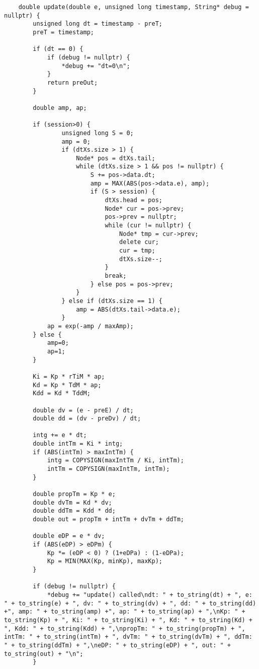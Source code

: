 \documentclass[a4paper,12pt]{article}
\begin{document}
\begin{lstlising}[language=C++]
\begin{lstlisting}
    double update(double e, unsigned long timestamp, String* debug = nullptr) {
        unsigned long dt = timestamp - preT;
        preT = timestamp;

        if (dt == 0) {
            if (debug != nullptr) {
                *debug += "dt=0\n";
            }
            return preOut;
        }

        double amp, ap;

        if (session>0) {
                unsigned long S = 0;
                amp = 0;
                if (dtXs.size > 1) {
                    Node* pos = dtXs.tail;
                    while (dtXs.size > 1 && pos != nullptr) {
                        S += pos->data.dt;
                        amp = MAX(ABS(pos->data.e), amp);
                        if (S > session) {
                            dtXs.head = pos;
                            Node* cur = pos->prev;
                            pos->prev = nullptr;
                            while (cur != nullptr) {
                                Node* tmp = cur->prev;
                                delete cur;
                                cur = tmp;
                                dtXs.size--;
                            }
                            break;
                        } else pos = pos->prev;
                    }
                } else if (dtXs.size == 1) {
                    amp = ABS(dtXs.tail->data.e);
                }        
            ap = exp(-amp / maxAmp);
        } else {
            amp=0;
            ap=1;
        }

        Ki = Kp * rTiM * ap;
        Kd = Kp * TdM * ap;
        Kdd = Kd * TddM;

        double dv = (e - preE) / dt;
        double dd = (dv - preDv) / dt;

        intg += e * dt;
        double intTm = Ki * intg;
        if (ABS(intTm) > maxIntTm) {
            intg = COPYSIGN(maxIntTm / Ki, intTm);
            intTm = COPYSIGN(maxIntTm, intTm);
        }

        double propTm = Kp * e;
        double dvTm = Kd * dv;
        double ddTm = Kdd * dd;
        double out = propTm + intTm + dvTm + ddTm;

        double eDP = e * dv;
        if (ABS(eDP) > eDPm) {
            Kp *= (eDP < 0) ? (1+eDPa) : (1-eDPa);
            Kp = MIN(MAX(Kp, minKp), maxKp);
        }

        if (debug != nullptr) {
            *debug += "update() called\ndt: " + to_string(dt) + ", e: " + to_string(e) + ", dv: " + to_string(dv) + ", dd: " + to_string(dd) +", amp: " + to_string(amp) +", ap: " + to_string(ap) + ",\nKp: " + to_string(Kp) + ", Ki: " + to_string(Ki) + ", Kd: " + to_string(Kd) + ", Kdd: " + to_string(Kdd) + ",\npropTm: " + to_string(propTm) + ", intTm: " + to_string(intTm) + ", dvTm: " + to_string(dvTm) + ", ddTm: " + to_string(ddTm) + ",\neDP: " + to_string(eDP) + ", out: " + to_string(out) + "\n";
        }


\end{lstlisting}
\end{lstlising}
\end{document}
